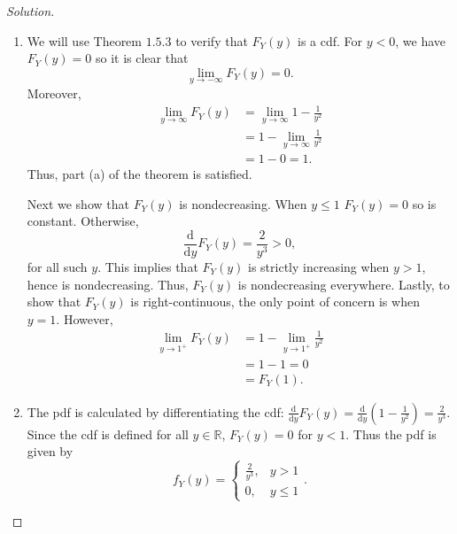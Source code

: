 \documentclass[12pt]{article}
\theoremstyle{definition}
\theoremstyle{plain}
\newenvironment{solution}
  {\begin{proof}[Solution]}
  {\end{proof}}
\newcommand{\deriv}[1]{\frac{\text{d}}{\text{d} #1}}
\begin{document}
\begin{enumerate}
\begin{solution}
\begin{enumerate}
\item We will use Theorem $ 1.5.3 $ to verify that $ F_Y(y) $ is a cdf. For $ y < 0 $, we have $ F_Y(y) = 0 $ so it is clear that 
\[ \lim_{y \to -\infty} F_Y(y) = 0. \]
Moreover, 
\begin{align*}
	\lim_{y \to \infty} F_Y(y) &= \lim_{y \to \infty} 1 - \frac{1}{y^2}\\
	&= 1 - \lim_{y \to \infty} \frac{1}{y^2}\\
	&= 1 - 0 = 1.
\end{align*}
Thus, part (a) of the theorem is satisfied. 

Next we show that $ F_Y(y) $ is nondecreasing. When $ y \leq 1 $ $ F_Y(y) = 0$ so is constant. Otherwise, 
\[ \deriv{y} F_Y(y) = \frac{2}{y^3} > 0, \]
for all such $ y $. This implies that $ F_Y(y) $ is strictly increasing when $ y > 1 $, hence is nondecreasing. Thus, $ F_Y(y) $ is nondecreasing everywhere. Lastly, to show that $ F_Y(y) $ is right-continuous, the only point of concern is when $ y = 1 $. However,
\begin{align*}
	\lim_{y \to 1^+} F_Y(y) &= 1 - \lim_{y \to 1^+}\frac{1}{y^2}\\
	&= 1 - 1 = 0\\
	&= F_Y(1).
\end{align*}

\item The pdf is calculated by differentiating the cdf: $\deriv{y} F_Y(y) = \deriv{y} (1 - \frac{1}{y^2}) = \frac{2}{y^3}$. Since the cdf is defined for all $ y \in \mathbb{R} $, $ F_Y(y) = 0 $ for $ y < 1 $. Thus the pdf is given by 
\[ f_Y(y) = 
\begin{cases}
	\frac{2}{y^3}, &y > 1\\
	0, & y \leq 1
\end{cases}. \] 


\end{enumerate}
\end{solution}
\end{enumerate}
\end{document}
